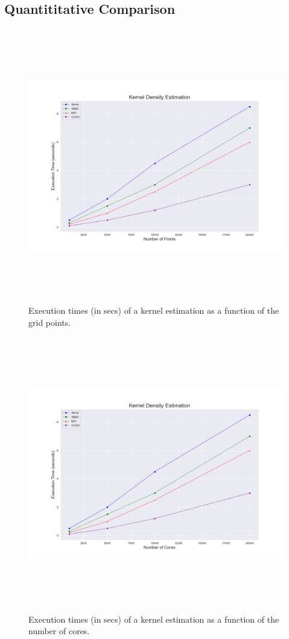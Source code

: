 \documentclass[review]{elsarticle}
\begin{document}
\subsection{Quantititative Comparison}
\begin{figure}
  \centering
  \includegraphics[width=15cm,height=12cm]{figures/execution_time_npoints_temp.png}
  \caption{Execution times (in secs) of a kernel estimation  as a function of the grid points. }
  \label{fig:time_npoints}
\end{figure}

\begin{figure}
  \centering
  \includegraphics[width=15cm,height=12cm]{figures/execution_time_ncores_temp.png}
  \caption{Execution times (in secs) of a kernel estimation  as a function of the number of cores.}
  \label{fig:time_ncores}
\end{figure}
\end{document}
